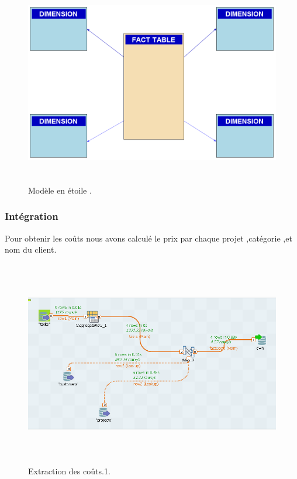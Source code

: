 \begin{figure}[H]
\center
\includegraphics[width=14cm,height=9cm]{./figures/etoile.png}
\caption{ Mod\`{e}le en \'{e}toile .}
\end{figure}



\subsubsection{Int\'{e}gration}


Pour obtenir les co\^{u}ts nous avons calcul\'{e} le prix par chaque projet
,cat\'{e}gorie ,et nom du client.

\begin{figure}[H]
\center
\includegraphics[width=14cm,height=9cm]{./figures/integ.png}
\caption{Extraction des co\^{u}ts.1.}
\end{figure}



